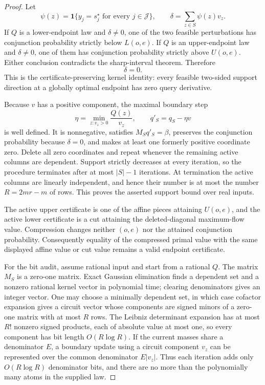 \documentclass{article}
\begin{document}
\begin{proof}
Let
\[
 \psi(z)=\mathbf 1\{y_j=s_j^\star\text{ for every }j\in\mathcal J\},
 \qquad \delta=\sum_{z\in S}\psi(z)v_z.
\]
If \(Q\) is a lower-endpoint law and \(\delta\neq0\), one of the two feasible perturbations has conjunction probability strictly below \(L(o,e)\). If \(Q\) is an upper-endpoint law and \(\delta\neq0\), one of them has conjunction probability strictly above \(U(o,e)\). Either conclusion contradicts the sharp-interval theorem. Therefore
\[
 \delta=0.
\]
This is the certificate-preserving kernel identity: every feasible two-sided support direction at a globally optimal endpoint has zero query derivative.

Because \(v\) has a positive component, the maximal boundary step
\[
 \eta=\min_{z:v_z>0}\frac{Q(z)}{v_z},
 \qquad q'_S=q_S-\eta v
\]
is well defined. It is nonnegative, satisfies \(M_Sq'_S=\beta\), preserves the conjunction probability because \(\delta=0\), and makes at least one formerly positive coordinate zero. Delete all zero coordinates and repeat whenever the remaining active columns are dependent. Support strictly decreases at every iteration, so the procedure terminates after at most \(|S|-1\) iterations. At termination the active columns are linearly independent, and hence their number is at most the number \(R=2mr-m\) of rows. This proves the asserted support bound over real inputs.

The active upper certificate is one of the affine pieces attaining \(U(o,e)\), and the active lower certificate is a cut attaining the deleted-diagonal maximum-flow value. Compression changes neither \((o,e)\) nor the attained conjunction probability. Consequently equality of the compressed primal value with the same displayed affine value or cut value remains a valid endpoint certificate.

For the bit audit, assume rational input and start from a rational \(Q\). The matrix \(M_S\) is a zero-one matrix. Exact Gaussian elimination finds a dependent set and a nonzero rational kernel vector in polynomial time; clearing denominators gives an integer vector. One may choose a minimally dependent set, in which case cofactor expansion gives a circuit vector whose components are signed minors of a zero-one matrix with at most \(R\) rows. The Leibniz determinant expansion has at most \(R!\) nonzero signed products, each of absolute value at most one, so every component has bit length \(O(R\log R)\). If the current masses share a denominator \(E\), a boundary update using a circuit component \(v_z\) can be represented over the common denominator \(E|v_z|\). Thus each iteration adds only \(O(R\log R)\) denominator bits, and there are no more than the polynomially many atoms in the supplied law.


\end{proof}
\end{document}
